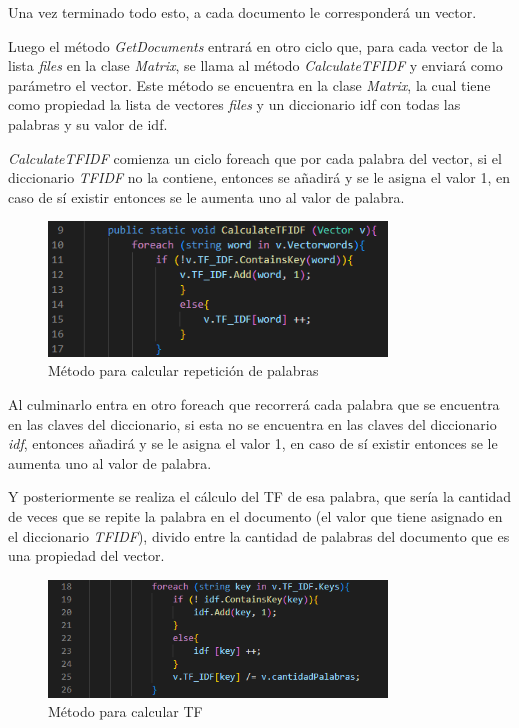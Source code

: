 \documentclass[10pt, letterpaper]{article}
\begin{document}
        Una vez terminado todo esto, a cada documento le corresponderá un vector.

Luego el método \textit{GetDocuments} entrará en otro ciclo que, para cada vector de la lista \textit{files} en la clase \textit{Matrix}, 
se llama al método \textit{CalculateTFIDF} y enviará como parámetro el vector. Este método se encuentra en la clase \textit{Matrix},
la cual tiene como propiedad la lista de vectores \textit{files} y un diccionario idf con todas las palabras y su valor
de idf.

\textit{CalculateTFIDF} comienza un ciclo foreach que por cada palabra del vector, si el diccionario \textit{TFIDF}
no la contiene, entonces se añadirá y se le asigna el valor 1, en caso de sí existir entonces se le aumenta uno al
valor de palabra.

\begin{figure}[h]

    \centering
    \label{imag: calculoTFIDF}
    \includegraphics[width=9cm]{CalcularTFIDF.png}
    \caption[]{ \footnotesize Método para calcular repetición de palabras}

\end{figure}

Al culminarlo entra en otro foreach que recorrerá cada palabra que se encuentra en las claves del diccionario,
si esta no se encuentra en las claves del diccionario \textit{idf}, entonces añadirá y se le asigna el valor 1, en caso 
de sí existir entonces se le aumenta uno al valor de palabra.

\newpage

Y posteriormente se realiza el cálculo del TF de esa palabra, que sería la cantidad de veces que se repite la 
palabra en el documento (el valor que tiene asignado en el diccionario \textit{TFIDF}), divido entre la cantidad
de palabras del documento que es una propiedad del vector.

\begin{figure}[h]

    \centering
    \label{imag: TF}
    \includegraphics[width=9cm]{TF.png}
    \caption[]{ \footnotesize Método para calcular TF}

\end{figure}
\end{document}
